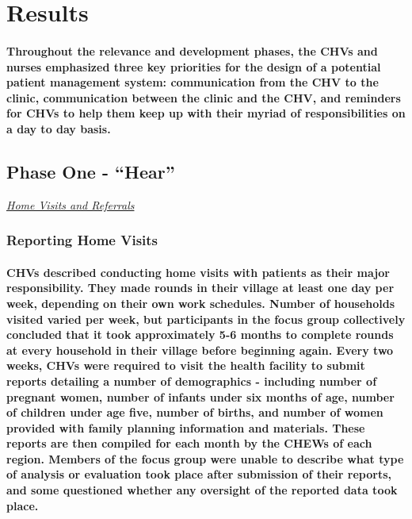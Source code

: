 \section{Results}
\paragraph{Throughout the relevance and development phases, the CHVs and nurses emphasized three key priorities for the design of a potential patient management system: communication from the CHV to the clinic, communication between the clinic and the CHV, and reminders for CHVs to help them keep up with their myriad of responsibilities on a day to day basis.} 


\subsection{Phase One - ``Hear''}

\underline{\textit{Home Visits and Referrals}}

\subsubsection{Reporting Home Visits}
\paragraph{CHVs described conducting home visits with patients as their major responsibility. They made rounds in their village at least one day per week, depending on their own work schedules. Number of households visited varied per week, but participants in the focus group collectively concluded that it took approximately 5-6 months to complete rounds at every household in their village before beginning again. Every two weeks, CHVs were required to visit the health facility to submit reports detailing a number of demographics - including number of pregnant women, number of infants under six months of age, number of children under age five, number of births, and number of women provided with family planning information and materials. These reports are then compiled for each month by the CHEWs of each region. Members of the focus group were unable to describe what type of analysis or evaluation took place after submission of their reports, and some questioned whether any oversight of the reported data took place.}

